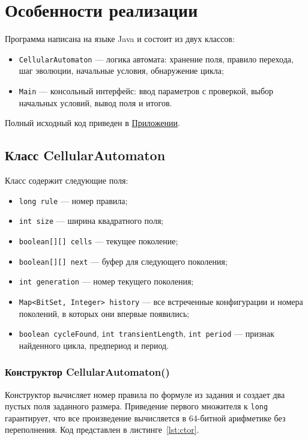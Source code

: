 \newpage
\section{Особенности реализации}
\label{sec:impl}

Программа написана на языке Java и состоит из двух классов:
\begin{itemize}
	\item \texttt{CellularAutomaton} --- логика автомата: хранение поля, правило перехода, шаг эволюции, начальные условия, обнаружение цикла;
	\item \texttt{Main} --- консольный интерфейс: ввод параметров с проверкой, выбор начальных условий, вывод поля и итогов.
\end{itemize}
Полный исходный код приведен в \hyperref[app:code]{Приложении}.

\subsection{Класс CellularAutomaton}

Класс содержит следующие поля:
\begin{itemize}
	\item \texttt{long rule} --- номер правила;
	\item \texttt{int size} --- ширина квадратного поля;
	\item \texttt{boolean[][] cells} --- текущее поколение;
	\item \texttt{boolean[][] next} --- буфер для следующего поколения;
	\item \texttt{int generation} --- номер текущего поколения;
	\item \texttt{Map<BitSet, Integer> history} --- все встреченные конфигурации и номера поколений, в которых они впервые появились;
	\item \texttt{boolean cycleFound}, \texttt{int transientLength}, \texttt{int period} --- признак найденного цикла, предпериод и период.
\end{itemize}

\subsubsection*{Конструктор CellularAutomaton()}

Конструктор вычисляет номер правила по формуле из задания и создает два пустых поля заданного размера. Приведение первого множителя к \texttt{long} гарантирует, что все произведение вычисляется в 64-битной арифметике без переполнения. Код представлен в листинге~\ref{lst:ctor}.

